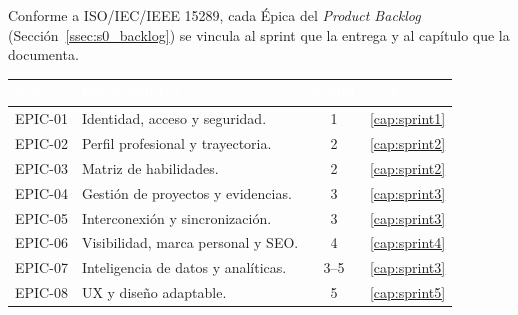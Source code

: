 Conforme a ISO/IEC/IEEE 15289, cada Épica del \textit{Product Backlog}
(Sección~\ref{ssec:s0_backlog}) se vincula al sprint que la entrega y al capítulo que la
documenta.\par

\renewcommand{\arraystretch}{1.3}
\fontsize{9}{10.8}\selectfont\sffamily
\noindent
\begin{tabularx}{\textwidth}{|l|X|c|c|}
\hline
\rowcolor{colorPrimario}
\textcolor{white}{\textbf{Épica}} & \textcolor{white}{\textbf{Funcionalidad}} & \textcolor{white}{\textbf{Sprint}} & \textcolor{white}{\textbf{Cap.}} \\ \hline
EPIC-01 & Identidad, acceso y seguridad. & 1 & \ref{cap:sprint1} \\ \hline
\rowcolor{grisTecnico}
EPIC-02 & Perfil profesional y trayectoria. & 2 & \ref{cap:sprint2} \\ \hline
EPIC-03 & Matriz de habilidades. & 2 & \ref{cap:sprint2} \\ \hline
\rowcolor{grisTecnico}
EPIC-04 & Gestión de proyectos y evidencias. & 3 & \ref{cap:sprint3} \\ \hline
EPIC-05 & Interconexión y sincronización. & 3 & \ref{cap:sprint3} \\ \hline
\rowcolor{grisTecnico}
EPIC-06 & Visibilidad, marca personal y SEO. & 4 & \ref{cap:sprint4} \\ \hline
EPIC-07 & Inteligencia de datos y analíticas. & 3--5 & \ref{cap:sprint3} \\ \hline
\rowcolor{grisTecnico}
EPIC-08 & UX y diseño adaptable. & 5 & \ref{cap:sprint5} \\ \hline
\end{tabularx}\normalfont\normalsize

\clearpage
